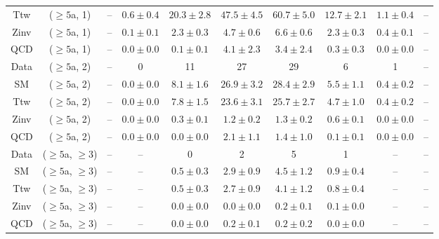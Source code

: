 \begin{table}[h!]
{\begin{tabular}{cccccccccc}
	Ttw & ($\ge5$a, 1) & -- & $0.6\pm 0.4$ & $20.3\pm 2.8$ & $47.5\pm 4.5$ & $60.7\pm 5.0$ & $12.7\pm 2.1$ & $1.1\pm 0.4$ & -- \\[0.5ex] 
	Zinv & ($\ge5$a, 1) & -- & $0.1\pm 0.1$ & $2.3\pm 0.3$ & $4.7\pm 0.6$ & $6.6\pm 0.6$ & $2.3\pm 0.3$ & $0.4\pm 0.1$ & -- \\[0.5ex] 
	QCD & ($\ge5$a, 1) & -- & $0.0\pm 0.0$ & $0.1\pm 0.1$ & $4.1\pm 2.3$ & $3.4\pm 2.4$ & $0.3\pm 0.3$ & $0.0\pm 0.0$ & -- \\[0.5ex] 
	Data & ($\ge5$a, 2) & -- & 0 & 11 & 27 & 29 & 6 & 1 & -- \\[0.5ex] 
	SM & ($\ge5$a, 2) & -- & $0.0\pm 0.0$ & $8.1\pm 1.6$ & $26.9\pm 3.2$ & $28.4\pm 2.9$ & $5.5\pm 1.1$ & $0.4\pm 0.2$ & -- \\[0.5ex] 
	Ttw & ($\ge5$a, 2) & -- & $0.0\pm 0.0$ & $7.8\pm 1.5$ & $23.6\pm 3.1$ & $25.7\pm 2.7$ & $4.7\pm 1.0$ & $0.4\pm 0.2$ & -- \\[0.5ex] 
	Zinv & ($\ge5$a, 2) & -- & $0.0\pm 0.0$ & $0.3\pm 0.1$ & $1.2\pm 0.2$ & $1.3\pm 0.2$ & $0.6\pm 0.1$ & $0.0\pm 0.0$ & -- \\[0.5ex] 
	QCD & ($\ge5$a, 2) & -- & $0.0\pm 0.0$ & $0.0\pm 0.0$ & $2.1\pm 1.1$ & $1.4\pm 1.0$ & $0.1\pm 0.1$ & $0.0\pm 0.0$ & -- \\[0.5ex] 
	Data & ($\ge5$a, $\ge3$) & -- & -- & 0 & 2 & 5 & 1 & -- & -- \\[0.5ex] 
	SM & ($\ge5$a, $\ge3$) & -- & -- & $0.5\pm 0.3$ & $2.9\pm 0.9$ & $4.5\pm 1.2$ & $0.9\pm 0.4$ & -- & -- \\[0.5ex] 
	Ttw & ($\ge5$a, $\ge3$) & -- & -- & $0.5\pm 0.3$ & $2.7\pm 0.9$ & $4.1\pm 1.2$ & $0.8\pm 0.4$ & -- & -- \\[0.5ex] 
	Zinv & ($\ge5$a, $\ge3$) & -- & -- & $0.0\pm 0.0$ & $0.0\pm 0.0$ & $0.2\pm 0.1$ & $0.1\pm 0.0$ & -- & -- \\[0.5ex] 
	QCD & ($\ge5$a, $\ge3$) & -- & -- & $0.0\pm 0.0$ & $0.2\pm 0.1$ & $0.2\pm 0.2$ & $0.0\pm 0.0$ & -- & -- \\[0.5ex] 
	\hline
	\hline
\end{tabular}}
\end{table}
